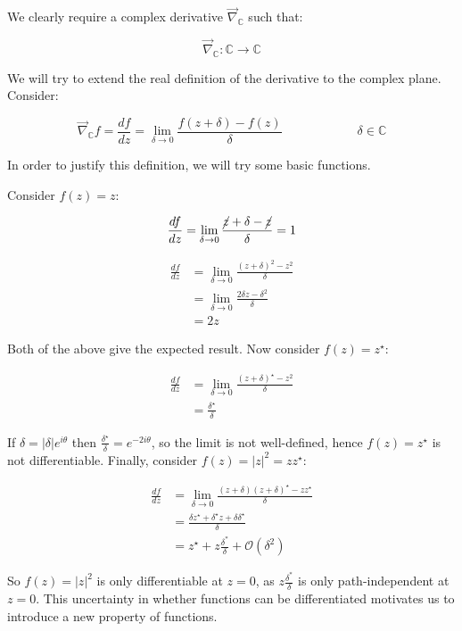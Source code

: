 \documentclass{physics_notes}
\begin{document}
We clearly require a complex derivative $\vec{\nabla}_{\mathbb{C}}$ such that:

\[ \vec{\nabla}_{\mathbb{C}}: \mathbb{C} \longrightarrow \mathbb{C} \]

We will try to extend the real definition of the derivative to the complex plane. Consider:

\[ \vec{\nabla}_{\mathbb{C}} f = \frac{df}{dz} = \lim_{\delta\to 0} \frac{f(z+\delta) - f(z)}{\delta} \hspace{1in} \delta \in \mathbb{C}\]

In order to justify this definition, we will try some basic functions. 

Consider $f(z) = z$:

\begin{align*}
\frac{df}{dz} = \lim_{\delta\to 0} \frac{\cancel{z}+\delta - \cancel{z}}{\delta} = 1
\end{align*}

 \begin{align*}
\frac{df}{dz} &= \lim_{\delta\to 0} \frac{(z+\delta)^2 - z^2}{\delta} \\
&= \lim_{\delta\to 0} \frac{2\delta z - \delta^2}{\delta} \\
&= 2z
\end{align*}

Both of the above give the expected result. Now consider $f(z) = z^\star$:

\begin{align*}
\frac{df}{dz} &= \lim_{\delta\to 0} \frac{(z+\delta)^\star - z^2}{\delta} \\
&= \frac{\delta^\star}{\delta} 
\end{align*}

If $\delta = |\delta|e^{i\theta}$ then $\frac{\delta^\star}{\delta} = e^{-2i\theta}$, so the limit is not well-defined, hence $f(z) = z^\star$ is not differentiable. Finally, consider $f(z) = |z|^2 = z z^\star$:

\begin{align*}
\frac{df}{dz} &= \lim_{\delta\to 0} \frac{(z+\delta) (z+\delta)^\star - z z^\star}{\delta} \\
&= \frac{\delta z^\star + \delta^\star z + \delta \delta^\star}{\delta} \\
&= z^\star + z\frac{\delta^*}{\delta} + \mathcal{O}(\delta^2)
\end{align*}

So $f(z) = |z|^2$ is only differentiable at $z=0$, as $z\frac{\delta^*}{\delta}$ is only path-independent at $z=0$. This uncertainty in whether functions can be differentiated motivates us to introduce a new property of functions.
\end{document}
